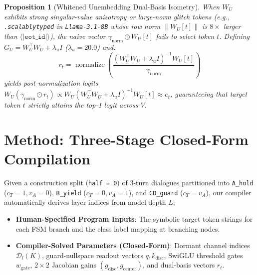 \documentclass[10pt,twocolumn]{article}
\newtheorem{proposition}{Proposition}
\begin{document}
\begin{proposition}[Whitened Unembedding Dual-Basis Isometry]
\label{prop:dualbasis}
When $W_U$ exhibits strong singular-value anisotropy or large-norm glitch tokens (e.g., \texttt{.scalablytyped} in \texttt{Llama-3.1-8B} whose row norm $\|W_U[t]\|$ is $8\times$ larger than $\langle\texttt{|eot\_id|}\rangle$), the naive vector $\gamma_{\mathrm{norm}} \odot W_U[t]$ fails to select token $t$. Defining $G_U = W_U^\top W_U + \lambda_u I$ ($\lambda_u = 20.0$) and:
\begin{equation}
r_t = \operatorname{normalize}\!\left( \frac{(W_U^\top W_U + \lambda_u I)^{-1} W_U[t]}{\gamma_{\mathrm{norm}}} \right)
\end{equation}
yields post-normalization logits $W_U (\gamma_{\mathrm{norm}} \odot r_t) \propto W_U (W_U^\top W_U + \lambda_u I)^{-1} W_U[t] \approx e_t$, guaranteeing that target token $t$ strictly attains the top-1 logit across $V$.
\end{proposition}

\section{Method: Three-Stage Closed-Form Compilation}

Given a construction split (\texttt{half = 0}) of 3-turn dialogues partitioned into \texttt{A\_hold} ($c_T=1, v_A=0$), \texttt{B\_yield} ($c_T=0, v_A=1$), and \texttt{CD\_guard} ($c_T=v_A$), our compiler automatically derives layer indices from model depth $L$:
\begin{itemize}
    \item \textbf{Human-Specified Program Inputs}: The symbolic target token strings for each FSM branch and the class label mapping at branching nodes.
    \item \textbf{Compiler-Solved Parameters (Closed-Form)}: Dormant channel indices $\mathcal{D}_l(K)$, guard-nullspace readout vectors $q, k_{\mathrm{disc}}$, SwiGLU threshold gates $w_{\mathrm{gate}}$, $2\times 2$ Jacobian gains $(g_{\mathrm{disc}}, g_{\mathrm{center}})$, and dual-basis vectors $r_t$.
\end{itemize}
\end{document}
